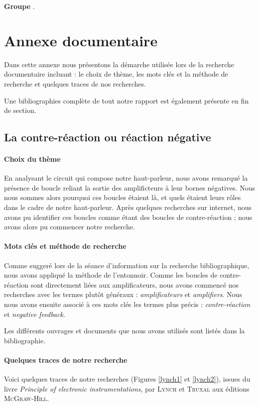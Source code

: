 

\textbf{Groupe }.

\section{Annexe documentaire}
Dans cette annexe nous présentons la démarche utilisée lors de la recherche
documentaire incluant : le choix de thème, les mots clés et la méthode de recherche
et quelques traces de nos recherches.

Une bibliographies complète de tout notre rapport est également présente
en fin de section.

\subsection{La contre-réaction ou réaction négative}

\paragraph{Choix du thème}
En analysant le circuit qui compose notre haut-parleur, nous avons remarqué
la présence de boucle reliant la sortie des amplificteurs à leur bornes négatives.
Nous nous sommes alors pourquoi ces boucles étaient là, et quels étaient leurs rôles
dans le cadre de notre haut-parleur. Après quelques recherches sur internet, nous avons
pu identifier ces boucles comme étant des boucles de contre-réaction ; nous avons
alors pu commencer notre recherche.

\paragraph{Mots clés et méthode de recherche}
Comme suggeré lors de la séance d'information sur la recherche bibliographique,
nous avons appliqué la méthode de l'entonnoir. Comme les boucles de contre-réaction 
sont directement liées aux amplificateurs, nous avons commencé nos recherches avec 
les termes plutôt généraux : \textit{amplificateurs} et \textit{amplifiers}. Nous 
nous avons ensuite associé à ces mots clés les termes plus précis : \textit{contre-réaction}
et \textit{negative feedback}.

Les différents ouvrages et documents que nous avons utilisés sont listés dans la bibliographie.

\paragraph{Quelques traces de notre recherche}
Voici quelques traces de notre recherches (Figures \ref{lynch1} et \ref{lynch2}), issues du livre 
\textit{Principle of electronic instrumentations},
par \textsc{Lynch} et \textsc{Truxal} aux éditions \textsc{McGraw-Hill}.

